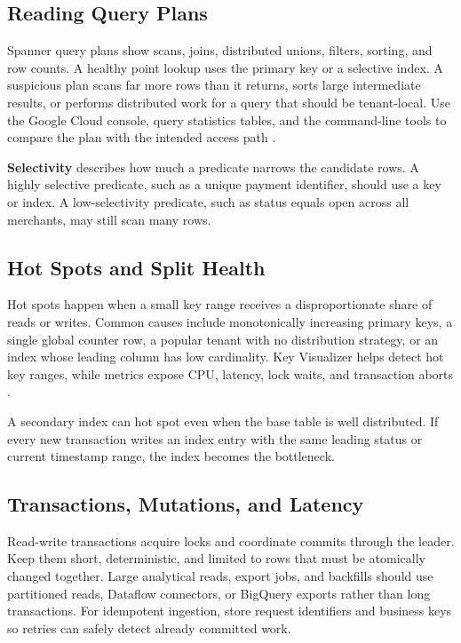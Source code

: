 \subsection{Reading Query Plans}
Spanner query plans show scans, joins, distributed unions, filters, sorting, and row counts. A healthy point lookup uses the primary key or a selective index. A suspicious plan scans far more rows than it returns, sorts large intermediate results, or performs distributed work for a query that should be tenant-local. Use the Google Cloud console, query statistics tables, and the command-line tools to compare the plan with the intended access path \cite{googlecloudspannerquerydocs}.

\begin{definitionbox}
\textbf{Selectivity} describes how much a predicate narrows the candidate rows. A highly selective predicate, such as a unique payment identifier, should use a key or index. A low-selectivity predicate, such as status equals open across all merchants, may still scan many rows.
\end{definitionbox}

\subsection{Hot Spots and Split Health}
Hot spots happen when a small key range receives a disproportionate share of reads or writes. Common causes include monotonically increasing primary keys, a single global counter row, a popular tenant with no distribution strategy, or an index whose leading column has low cardinality. Key Visualizer helps detect hot key ranges, while metrics expose CPU, latency, lock waits, and transaction aborts \cite{googlecloudspannerkeyvisualizer}.

\begin{pitfall}
A secondary index can hot spot even when the base table is well distributed. If every new transaction writes an index entry with the same leading status or current timestamp range, the index becomes the bottleneck.
\end{pitfall}

\subsection{Transactions, Mutations, and Latency}
Read-write transactions acquire locks and coordinate commits through the leader. Keep them short, deterministic, and limited to rows that must be atomically changed together. Large analytical reads, export jobs, and backfills should use partitioned reads, Dataflow connectors, or BigQuery exports rather than long transactions. For idempotent ingestion, store request identifiers and business keys so retries can safely detect already committed work.

